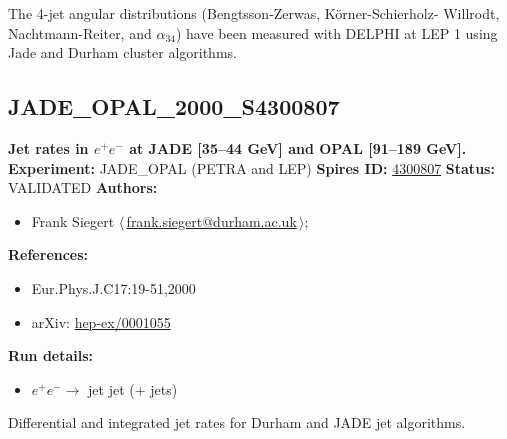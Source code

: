 \noindent The 4-jet angular distributions (Bengtsson-Zerwas, K\"orner-Schierholz- Willrodt, Nachtmann-Reiter, and $\alpha_{34}$) have been measured with DELPHI at LEP 1 using Jade and Durham cluster algorithms.

\clearpage


\clearpage

\subsection[JADE\_OPAL\_2000\_S4300807]{JADE\_OPAL\_2000\_S4300807\,\cite{Pfeifenschneider:1999rz}}
\textbf{Jet rates in $e^+e^-$ at JADE [35--44 GeV] and OPAL [91--189 GeV].}\newline
\textbf{Experiment:} JADE_OPAL (PETRA and LEP) \newline
\textbf{Spires ID:} \href{http://www.slac.stanford.edu/spires/find/hep/www?rawcmd=key+4300807}{4300807}\newline
\textbf{Status:} VALIDATED\newline
\textbf{Authors:}
\begin{itemize}
  \item Frank Siegert $\langle\,$\href{mailto:frank.siegert@durham.ac.uk}{frank.siegert@durham.ac.uk}$\,\rangle$;
\end{itemize}
\textbf{References:}
\begin{itemize}
  \item Eur.Phys.J.C17:19-51,2000
  \item arXiv: \href{http://arxiv.org/abs/hep-ex/0001055}{hep-ex/0001055}
\end{itemize}
\textbf{Run details:}
\begin{itemize}

  \item $e^+ e^- \to$ jet jet (+ jets)\end{itemize}

\noindent Differential and integrated jet rates for Durham and JADE jet algorithms.

\clearpage


\clearpage

